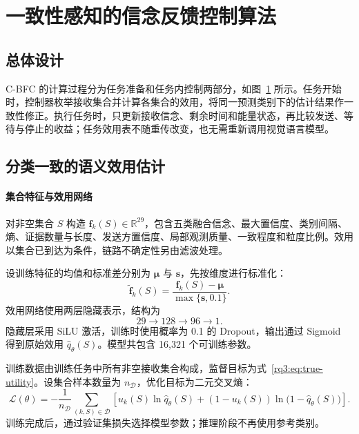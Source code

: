 \section{一致性感知的信念反馈控制算法}
\label{rq3:sec:method}

\subsection{总体设计}

C-BFC 的计算过程分为任务准备和任务内控制两部分，如图~\ref{rq3:fig:controller} 所示。任务开始时，控制器枚举接收集合并计算各集合的效用，将同一预测类别下的估计结果作一致性修正。执行任务时，只更新接收信念、剩余时间和能量状态，再比较发送、等待与停止的收益；任务效用表不随重传改变，也无需重新调用视觉语言模型。

\begin{figure}[t]
  \centering
  
  \label{rq3:fig:controller}
\end{figure}

\subsection{分类一致的语义效用估计}
\label{rq3:subsec:utility}

\paragraph{集合特征与效用网络}
对非空集合 $S$ 构造 $\bm f_k(S)\in\mathbb R^{29}$，包含五类融合信念、最大置信度、类别间隔、熵、证据数量与长度、发送方置信度、局部观测质量、一致程度和粒度比例。效用以集合已到达为条件，链路不确定性另由滤波处理。

设训练特征的均值和标准差分别为 $\bm\mu$ 与 $\bm s$，先按维度进行标准化：
\begin{equation}
  \widetilde{\bm f}_k(S)=\frac{\bm f_k(S)-\bm\mu}{\max\{\bm s,0.1\}}.
  \label{rq3:eq:feature-normalization}
\end{equation}
效用网络使用两层隐藏表示，结构为
\begin{equation}
  29\longrightarrow128\longrightarrow96\longrightarrow1.
  \label{rq3:eq:network-architecture}
\end{equation}
隐藏层采用 SiLU 激活，训练时使用概率为 0.1 的 Dropout，输出通过 Sigmoid 得到原始效用 $\hat q_\theta(S)$。模型共包含 16,321 个可训练参数。

训练数据由训练任务中所有非空接收集合构成，监督目标为式~\eqref{rq3:eq:true-utility}。设集合样本数量为 $n_{\mathcal D}$，优化目标为二元交叉熵：
\begin{equation}
  \mathcal L(\theta)=-\frac{1}{n_{\mathcal D}}
  \sum_{(k,S)\in\mathcal D}
  \left[u_k(S)\ln\hat q_\theta(S)
  +(1-u_k(S))\ln\bigl(1-\hat q_\theta(S)\bigr)\right].
  \label{rq3:eq:utility-loss}
\end{equation}
训练完成后，通过验证集损失选择模型参数；推理阶段不再使用参考类别。

